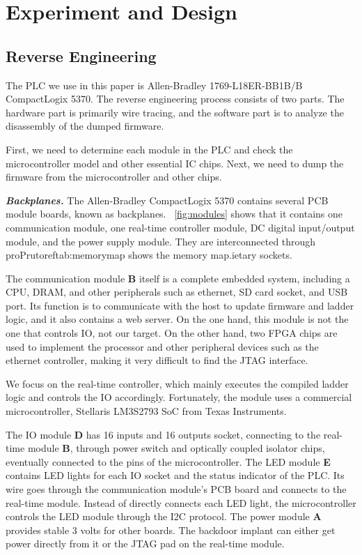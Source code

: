 \section{Experiment and Design}
\label{sec:implant-experiment}

\subsection{Reverse Engineering}
The PLC we use in this paper is Allen-Bradley 1769-L18ER-BB1B/B CompactLogix 5370. The reverse engineering process consists of two parts. The hardware part is primarily wire tracing, and the software part is to analyze the disassembly of the dumped firmware.

First, we need to determine each module in the PLC and check the microcontroller model and other essential IC chips. Next, we need to dump the firmware from the microcontroller and other chips.

\textbf{\textit{Backplanes.}} The Allen-Bradley CompactLogix 5370 contains several PCB module boards, known as backplanes. ~\autoref{fig:modules} shows that it contains one communication module, one real-time controller module, DC digital input/output module, and the power supply module. They are interconnected through proPrutoref{tab:memorymap} shows the memory map.ietary sockets.

The communication module \textbf{B} itself is a complete embedded system, including a CPU, DRAM, and other peripherals such as ethernet, SD card socket, and USB port. Its function is to communicate with the host to update firmware and ladder logic, and it also contains a web server. On the one hand, this module is not the one that controls IO, not our target. On the other hand, two FPGA chips are used to implement the processor and other peripheral devices such as the ethernet controller, making it very difficult to find the JTAG interface.

We focus on the real-time controller, which mainly executes the compiled ladder logic and controls the IO accordingly. Fortunately, the module uses a commercial microcontroller, Stellaris LM3S2793 SoC from Texas Instruments.

The IO module \textbf{D} has 16 inputs and 16 outputs socket, connecting to the real-time module \textbf{B}, through power switch and optically coupled isolator chips, eventually connected to the pins of the microcontroller. The LED module \textbf{E} contains LED lights for each IO socket and the status indicator of the PLC. Its wire goes through the communication module's PCB board and connects to the real-time module. Instead of directly connects each LED light, the microcontroller controls the LED module through the I2C protocol. The power module \textbf{A} provides stable 3 volts for other boards. The backdoor implant can either get power directly from it or the JTAG pad on the real-time module.

